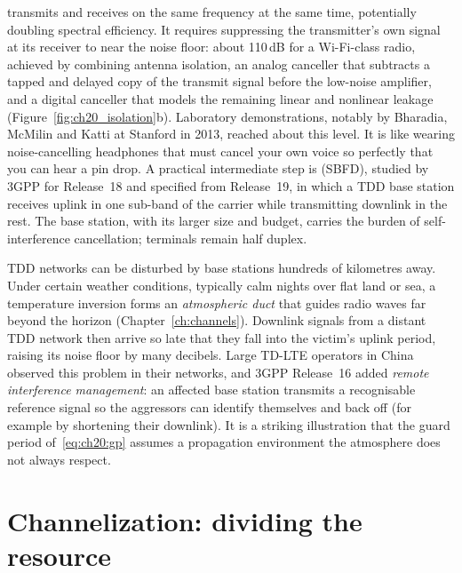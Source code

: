  transmits and receives on the same frequency at the same time,
potentially doubling spectral efficiency. It requires suppressing the transmitter's own signal at
its receiver to near the noise floor: about 110\,dB for a Wi-Fi-class radio, achieved by
combining antenna isolation, an analog canceller that subtracts a tapped and delayed copy of the
transmit signal before the low-noise amplifier, and a digital canceller that models the
remaining linear and nonlinear leakage (Figure~\ref{fig:ch20_isolation}b). Laboratory
demonstrations, notably by Bharadia, McMilin and Katti at Stanford in 2013, reached about this
level. It is like wearing noise-cancelling headphones that must cancel your own voice so perfectly
that you can hear a pin drop. A practical intermediate step is  (SBFD),
studied by 3GPP for Release~18 and specified from Release~19, in which a TDD base station receives
uplink in one sub-band of the carrier while transmitting downlink in the rest. The base station,
with its larger size and budget, carries the burden of self-interference cancellation; terminals
remain half duplex.

\begin{inpractice}
TDD networks can be disturbed by base stations hundreds of kilometres away. Under certain
weather conditions, typically calm nights over flat land or sea, a temperature inversion forms an
\emph{atmospheric duct} that guides radio waves far beyond the horizon (Chapter~\ref{ch:channels}).
Downlink signals from a distant TDD network then arrive so late that they fall into the victim's
uplink period, raising its noise floor by many decibels. Large TD-LTE operators in China observed
this problem in their networks, and 3GPP Release~16 added \emph{remote interference management}:
an affected base station transmits a recognisable reference signal so the aggressors can identify
themselves and back off (for example by shortening their downlink). It is a striking illustration
that the guard period of~\eqref{eq:ch20:gp} assumes a propagation environment the atmosphere does
not always respect.
\end{inpractice}

\section{Channelization: dividing the resource}
\label{sec:ch20:channelization}

